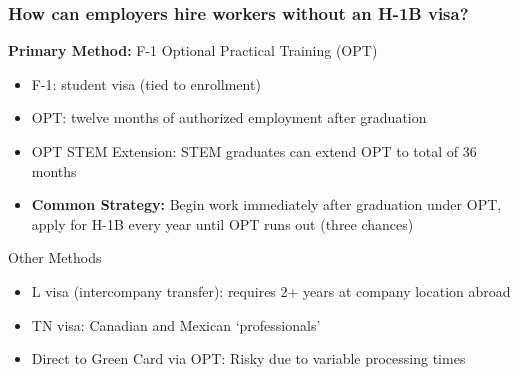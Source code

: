 \documentclass[xcolor=dvipsnames, compress, 12pt, aspectratio=169, handout]{beamer}
\begin{document}
\begin{frame}
    \frametitle{How can employers hire workers without an H-1B visa?}
    \textbf{Primary Method:} F-1 Optional Practical Training (OPT)
    \begin{itemize}
        \item F-1: student visa (tied to enrollment)
        \item OPT: twelve months of authorized employment after graduation 
        \item OPT STEM Extension: STEM graduates can extend OPT to total of 36 months 
        \item \textbf{Common Strategy:} Begin work immediately after graduation under OPT, apply for H-1B every year until OPT runs out (three chances)
    \end{itemize}
    \vspace{4mm}
    Other Methods 
    \begin{itemize}
        \item L visa (intercompany transfer): requires 2+ years at company location abroad
        \item TN visa: Canadian and Mexican `professionals'
        \item Direct to Green Card via OPT: Risky due to variable processing times
    \end{itemize}
\end{frame}
\end{document}
